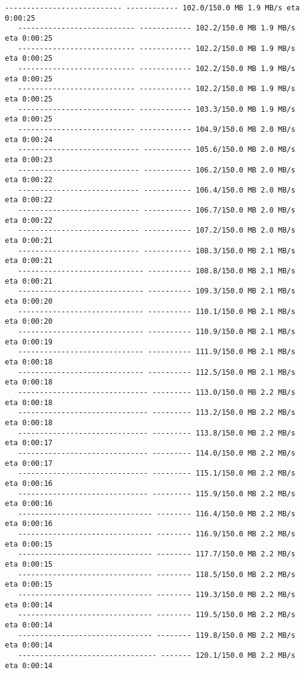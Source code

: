 \documentclass[11pt]{article}
\begin{document}
\begin{Verbatim}[commandchars=\\\{\}]
   --------------------------- ------------ 102.0/150.0 MB 1.9 MB/s eta 0:00:25
   --------------------------- ------------ 102.2/150.0 MB 1.9 MB/s eta 0:00:25
   --------------------------- ------------ 102.2/150.0 MB 1.9 MB/s eta 0:00:25
   --------------------------- ------------ 102.2/150.0 MB 1.9 MB/s eta 0:00:25
   --------------------------- ------------ 102.2/150.0 MB 1.9 MB/s eta 0:00:25
   --------------------------- ------------ 103.3/150.0 MB 1.9 MB/s eta 0:00:25
   --------------------------- ------------ 104.9/150.0 MB 2.0 MB/s eta 0:00:24
   ---------------------------- ----------- 105.6/150.0 MB 2.0 MB/s eta 0:00:23
   ---------------------------- ----------- 106.2/150.0 MB 2.0 MB/s eta 0:00:22
   ---------------------------- ----------- 106.4/150.0 MB 2.0 MB/s eta 0:00:22
   ---------------------------- ----------- 106.7/150.0 MB 2.0 MB/s eta 0:00:22
   ---------------------------- ----------- 107.2/150.0 MB 2.0 MB/s eta 0:00:21
   ---------------------------- ----------- 108.3/150.0 MB 2.1 MB/s eta 0:00:21
   ----------------------------- ---------- 108.8/150.0 MB 2.1 MB/s eta 0:00:21
   ----------------------------- ---------- 109.3/150.0 MB 2.1 MB/s eta 0:00:20
   ----------------------------- ---------- 110.1/150.0 MB 2.1 MB/s eta 0:00:20
   ----------------------------- ---------- 110.9/150.0 MB 2.1 MB/s eta 0:00:19
   ----------------------------- ---------- 111.9/150.0 MB 2.1 MB/s eta 0:00:18
   ----------------------------- ---------- 112.5/150.0 MB 2.1 MB/s eta 0:00:18
   ------------------------------ --------- 113.0/150.0 MB 2.2 MB/s eta 0:00:18
   ------------------------------ --------- 113.2/150.0 MB 2.2 MB/s eta 0:00:18
   ------------------------------ --------- 113.8/150.0 MB 2.2 MB/s eta 0:00:17
   ------------------------------ --------- 114.0/150.0 MB 2.2 MB/s eta 0:00:17
   ------------------------------ --------- 115.1/150.0 MB 2.2 MB/s eta 0:00:16
   ------------------------------ --------- 115.9/150.0 MB 2.2 MB/s eta 0:00:16
   ------------------------------- -------- 116.4/150.0 MB 2.2 MB/s eta 0:00:16
   ------------------------------- -------- 116.9/150.0 MB 2.2 MB/s eta 0:00:15
   ------------------------------- -------- 117.7/150.0 MB 2.2 MB/s eta 0:00:15
   ------------------------------- -------- 118.5/150.0 MB 2.2 MB/s eta 0:00:15
   ------------------------------- -------- 119.3/150.0 MB 2.2 MB/s eta 0:00:14
   ------------------------------- -------- 119.5/150.0 MB 2.2 MB/s eta 0:00:14
   ------------------------------- -------- 119.8/150.0 MB 2.2 MB/s eta 0:00:14
   -------------------------------- ------- 120.1/150.0 MB 2.2 MB/s eta 0:00:14

\end{Verbatim}
\end{document}
